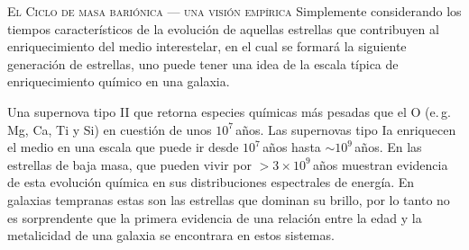\documentclass[xcolor=dvipsnames,4pt,hyperref={colorlinks,citecolor=black,linkcolor=black,urlcolor=black}]{beamer}
\begin{document}
\begin{frame}[allowframebreaks]{\textsc{El Ciclo de masa bariónica --- una visión empírica}}
%
Simplemente considerando los tiempos característicos de la evolución de aquellas estrellas que
contribuyen al enriquecimiento del medio interestelar, en el cual se formará la siguiente generación
de estrellas, uno puede tener una idea de la escala típica de enriquecimiento químico en una
galaxia.

Una supernova tipo II que retorna especies químicas más pesadas que el O (e.\,g. Mg, Ca, Ti y Si) en
cuestión de unos $10^7\,$años.
Las supernovas tipo Ia enriquecen el medio en una escala que puede ir desde $10^7\,$años hasta
$\sim10^9\,$años.
En las estrellas de baja masa, que pueden vivir por $>3\times10^9\,$años muestran evidencia de esta
evolución química en sus distribuciones espectrales de energía.
En galaxias tempranas estas son las estrellas que dominan su brillo, por lo tanto no es sorprendente
que la primera evidencia de una relación entre la edad y la metalicidad de una galaxia se encontrara
en estos sistemas.


\end{frame}
\end{document}
